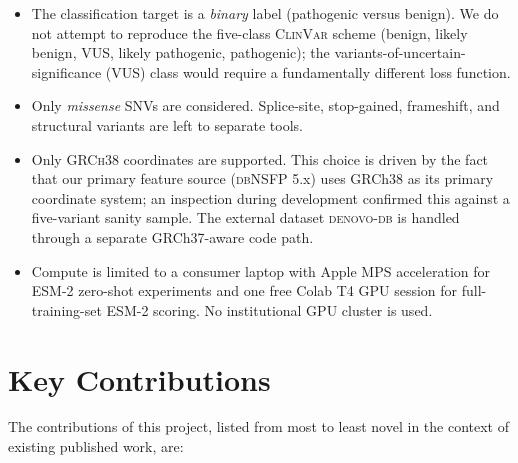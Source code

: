 \documentclass[11pt,a4paper,oneside]{report}
\begin{document}
\begin{itemize}
\item The classification target is a \emph{binary} label
(pathogenic versus benign). We do not attempt to reproduce
the five-class \textsc{ClinVar} scheme (benign, likely
benign, VUS, likely pathogenic, pathogenic); the
variants-of-uncertain-significance (VUS) class would
require a fundamentally different loss function.
\item Only \emph{missense} SNVs are considered. Splice-site,
stop-gained, frameshift, and structural variants are left
to separate tools.
\item Only \textsc{GRCh38} coordinates are supported. This
choice is driven by the fact that our primary feature
source (\textsc{dbNSFP} 5.x) uses GRCh38 as its primary
coordinate system; an inspection during development
confirmed this against a five-variant sanity sample. The
external dataset \textsc{denovo-db} is handled through a
separate GRCh37-aware code path.
\item Compute is limited to a consumer laptop with Apple MPS
acceleration for ESM-2 zero-shot experiments and one free
Colab T4 GPU session for full-training-set ESM-2
scoring. No institutional GPU cluster is used.
\end{itemize}

\section{Key Contributions}
\label{sec:intro-contributions}

The contributions of this project, listed from most to least
novel in the context of existing published work, are:
\end{document}
